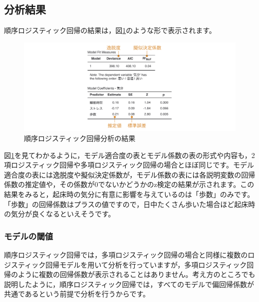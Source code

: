\documentclass[
  12pt,
  a5jpaper,
  lualatex, ja=standard]{bxjsbook}
\begin{document}
\hypertarget{sub:regression-ordinal-results}{%
\subsection{分析結果}\label{sub:regression-ordinal-results}}

順序ロジスティック回帰の結果は，図\ref{fig:regression-ordinal-results}のような形で表示されます。

\begin{figure}[!ht]

{\centering \includegraphics[width=1\linewidth]{images/regression/ordinal-results} 

}

\caption{順序ロジスティック回帰分析の結果}\label{fig:regression-ordinal-results}
\end{figure}

図\ref{fig:regression-ordinal-results}を見てわかるように，モデル適合度の表とモデル係数の表の形式や内容も，2項ロジスティック回帰や多項ロジスティック回帰の場合とほぼ同じです。モデル適合度の表には逸脱度や擬似決定係数が，モデル係数の表には各説明変数の回帰係数の推定値や，その係数が0でないかどうかのz検定の結果が示されます。この結果をみると，起床時の気分に有意に影響を与えているのは「歩数」のみです。「歩数」の回帰係数はプラスの値ですので，日中たくさん歩いた場合ほど起床時の気分が良くなるといえそうです。

\hypertarget{ux30e2ux30c7ux30ebux306eux95beux5024}{%
\subsubsection*{モデルの閾値}\label{ux30e2ux30c7ux30ebux306eux95beux5024}}

順序ロジスティック回帰では，多項ロジスティック回帰の場合と同様に複数のロジスティック回帰モデルを用いて分析を行っていますが，多項ロジスティック回帰のように複数の回帰係数が表示されることはありません。考え方のところでも説明したように，順序ロジスティック回帰では，すべてのモデルで偏回帰係数が共通であるという前提で分析を行うからです。
\end{document}
